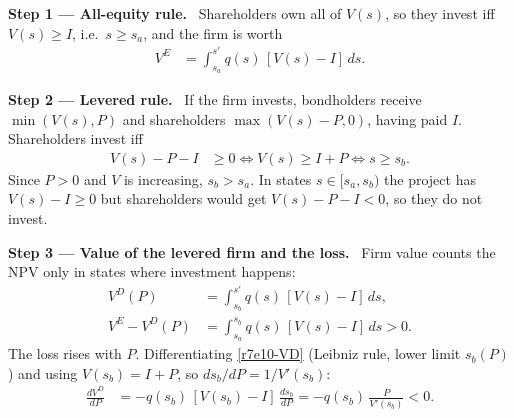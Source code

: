\documentclass[11pt,a4paper]{article}
\newcommand{\step}[2]{\par\medskip\noindent\textbf{Step #1 --- #2.}~}
\begin{document}
\step{1}{All-equity rule} Shareholders own all of $V(s)$, so they invest iff $V(s)\ge I$, i.e.\ $s\ge s_a$, and the firm is worth
\begin{align}
  V^{E} &= \int_{s_a}^{s'} q(s)\,[V(s)-I]\,ds. \label{r7e10-VE}
\end{align}

\step{2}{Levered rule} If the firm invests, bondholders receive $\min(V(s),P)$ and shareholders $\max(V(s)-P,0)$, having paid $I$. Shareholders invest iff
\begin{align}
  V(s) - P - I &\ge 0 \iff V(s) \ge I+P \iff s \ge s_b. \nonumber
\end{align}
Since $P>0$ and $V$ is increasing, $s_b>s_a$. In states $s\in[s_a,s_b)$ the project has $V(s)-I\ge0$ but shareholders would get $V(s)-P-I<0$, so they do not invest.

\step{3}{Value of the levered firm and the loss} Firm value counts the NPV only in states where investment happens:
\begin{align}
  V^{D}(P) &= \int_{s_b}^{s'} q(s)\,[V(s)-I]\,ds, \label{r7e10-VD}\\
  V^{E}-V^{D}(P) &= \int_{s_a}^{s_b} q(s)\,[V(s)-I]\,ds > 0. \label{r7e10-loss}
\end{align}
The loss rises with $P$. Differentiating \eqref{r7e10-VD} (Leibniz rule, lower limit $s_b(P)$) and using $V(s_b)=I+P$, so $ds_b/dP = 1/V'(s_b)$:
\begin{align}
  \frac{dV^{D}}{dP} &= -q(s_b)\,[V(s_b)-I]\,\frac{ds_b}{dP} = -q(s_b)\,\frac{P}{V'(s_b)} < 0. \nonumber
\end{align}
\end{document}
